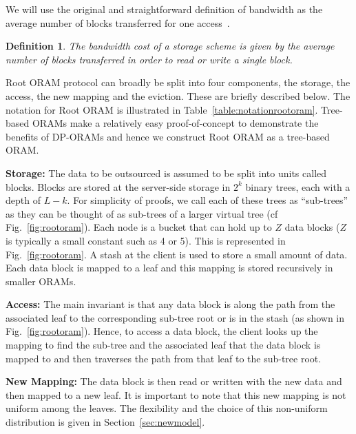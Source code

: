 \documentclass[USenglish,oneside,twocolumn]{article}
\makeatletter
\newcommand{\ourprotocol}{Root ORAM}
\let\origsubsection\subsection
\renewcommand\subsection{\@ifstar{\starsubsection}{\nostarsubsection}}
\newcommand\nostarsubsection[1]
{\subsectionprelude\origsubsection{#1}\subsectionpostlude}
\newcommand\starsubsection[1]
{\subsectionprelude\origsubsection*{#1}\subsectionpostlude}
\newcommand\subsectionprelude{\vspace{-1.5em}}
\newcommand\subsectionpostlude{\vspace{-1em}}
\newtheorem{defn}{Definition}
\makeatother
\begin{document}
We will use the original and straightforward definition of bandwidth as the average number of blocks transferred for one access~\cite{burstoram}.

\begin{defn}\label{def:bandwidth}
\textit{The bandwidth cost of a storage scheme is given by the average number of blocks transferred in order to read or write a single block.}
\end{defn}





\subsection{Approach Overview}
\ourprotocol{} protocol can broadly be split into four components, the storage, the access, the new mapping and the eviction. These are briefly described below. The notation for Root ORAM is illustrated in Table~\ref{table:notationrootoram}. Tree-based ORAMs make a relatively easy proof-of-concept to demonstrate the benefits of DP-ORAMs and hence we construct \ourprotocol{} as a tree-based ORAM.


\textbf{Storage: }The data to be outsourced is assumed to be split into units called blocks. Blocks are stored at the server-side storage in $2^k$ binary trees, each with a depth of $L-k$. For simplicity of proofs, we call each of these trees as ``sub-trees'' as they can be thought of as sub-trees of a larger virtual tree (cf Fig.~\ref{fig:rootoram}). Each node is a bucket that can hold up to $Z$ data blocks ($Z$ is typically a small constant such as 4 or 5). This is represented in Fig.~\ref{fig:rootoram}. A stash at the client is used to store a small amount of data. Each data block is mapped to a leaf and this mapping is stored recursively in smaller ORAMs.

\textbf{Access: }The main invariant is that any data block is along the path from the associated leaf to the corresponding sub-tree root or is in the stash (as shown in Fig.~\ref{fig:rootoram}). Hence, to access a data block, the client looks up the mapping to find the sub-tree and the associated leaf that the data block is mapped to and then traverses the path from that leaf to the sub-tree root.

\textbf{New Mapping: }The data block is then read or written with the new data and then mapped to a new leaf. It is important to note that this new mapping is not uniform among the leaves. The flexibility and the choice of this non-uniform distribution is given in Section~\ref{sec:newmodel}.
\end{document}
